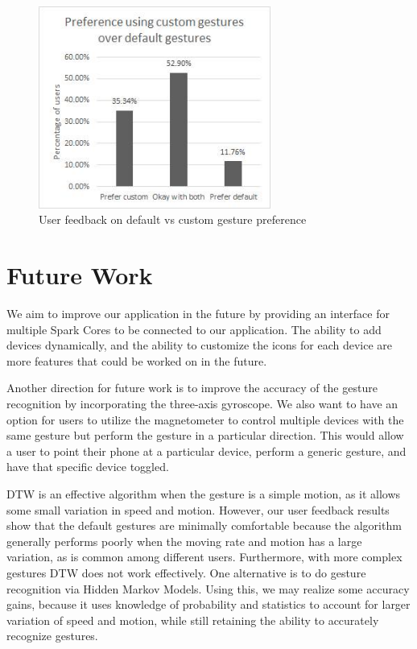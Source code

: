 \documentclass[journal]{IEEEtran}
\begin{document}
\begin{figure}[!t]
\centering
\includegraphics[width=3in]{R6.jpg}
\caption{User feedback on default vs custom gesture preference}
\label{customvsdefault}
\end{figure}


\section{Future Work}
We aim to improve our application in the future by providing an interface for multiple Spark Cores to be connected to our application. The ability to add devices dynamically, and the ability to customize the icons for each device are more features that could be worked on in the future.

Another direction for future work is to improve the accuracy of the gesture recognition by incorporating the three-axis gyroscope. We also want to have an option for users to utilize the magnetometer to control multiple devices with the same gesture but perform the gesture in a particular direction. This would allow a user to point their phone at a particular device, perform a generic gesture, and have that specific device toggled.

DTW is an effective algorithm when the gesture is a simple motion, as it allows some small variation in speed and motion. However, our user feedback results show that the default gestures are minimally comfortable because the algorithm generally performs poorly when the moving rate and motion has a large variation, as is common among different users. Furthermore, with more complex gestures DTW does not work effectively. One alternative is to do gesture recognition via Hidden Markov Models\cite{HMM}. Using this, we may realize some accuracy gains, because it uses knowledge of probability and statistics to account for larger variation of speed and motion, while still retaining the ability to accurately recognize gestures. 
\end{document}
